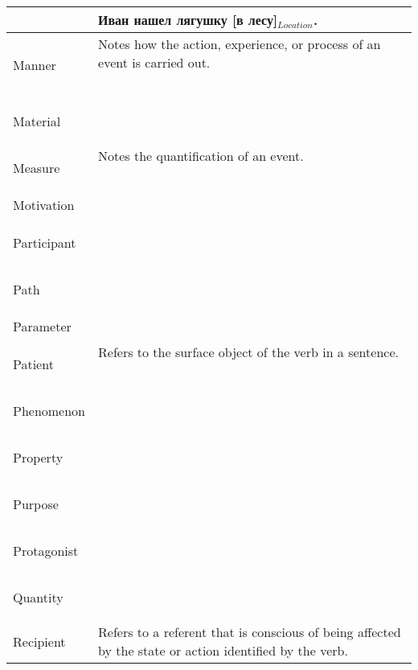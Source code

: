\documentclass[a4paper,11pt, onecolumn,twoside]{article}
\begin{document}
\begin{longtable}{ p{}  p{} }
        & Иван нашел лягушку [в лесу]$_{Location}$. \\
\midrule
 \multirow{2}{*}{Manner} & Notes how the action, experience, or process of an event is carried out. \\ 
        & ~ \\
\midrule
 \multirow{2}{*}{Material} & ~ \\ 
        & ~ \\
\midrule
 \multirow{2}{*}{Measure} & Notes the quantification of an event. \\ 
        & ~ \\
\midrule
 \multirow{2}{*}{Motivation} &  \\ 
        & ~ \\
\midrule
 \multirow{2}{*}{Participant} & ~ \\ 
        & ~ \\
\midrule
 \multirow{2}{*}{Path} & ~ \\ 
        & ~ \\
\midrule
 \multirow{2}{*}{Parameter} & \\
        & ~ \\
\midrule
 \multirow{2}{*}{Patient} & Refers to the surface object of the verb in a sentence. \\ 
        & ~ \\
\midrule
 \multirow{2}{*}{Phenomenon} & ~ \\  %
        & ~ \\
\midrule
 \multirow{2}{*}{Property} & ~ \\ 
        & ~ \\
\midrule
 \multirow{2}{*}{Purpose} & ~ \\ 
        & ~ \\
\midrule
 \multirow{2}{*}{Protagonist} & ~ \\ %
        & ~ \\
\midrule
 \multirow{2}{*}{Quantity} & ~ \\  %
        & ~ \\
\midrule
 \multirow{2}{*}{Recipient} & Refers to a referent that is conscious of being affected by the state or action identified by the verb. \\ 

\end{longtable}
\end{document}
